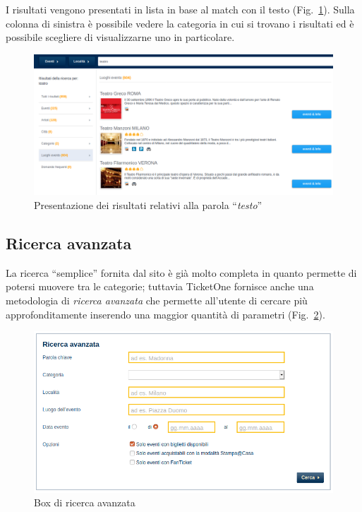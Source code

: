 	I risultati vengono presentati in lista in base al match con il testo (Fig.~\ref{ricerca2}).
	Sulla colonna di sinistra è possibile vedere la categoria in cui si trovano i risultati ed è possibile scegliere di visualizzarne uno in particolare.
	
	\begin{figure}[hbt]
		\centering
		\includegraphics[width=\textwidth]{img/ricerca_2.png}
		\caption{Presentazione dei risultati relativi alla parola ``\textit{testo}''}
		\label{ricerca2}
	\end{figure}

\subsection{Ricerca avanzata}

	La ricerca ``semplice'' fornita dal sito è già molto completa in quanto permette di potersi muovere tra le categorie; tuttavia TicketOne fornisce anche una metodologia di \textit{ricerca avanzata} che permette all'utente di cercare più approfonditamente inserendo una maggior quantità di parametri (Fig.~\ref{ricerca3}).
	
	\begin{figure}[hbt]
		\centering
		\includegraphics[width=\textwidth-.95cm]{img/ricerca_3.png}
		\caption{Box di ricerca avanzata}
		\label{ricerca3}
	\end{figure}

